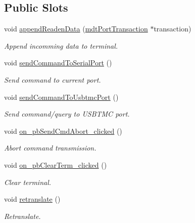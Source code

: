 \subsection*{Public Slots}
\begin{DoxyCompactItemize}
\item 
void \hyperlink{classmdt_port_term_a2c8de2e82437fc94420ccb542cc42bf2}{append\-Readen\-Data} (\hyperlink{classmdt_port_transaction}{mdt\-Port\-Transaction} $\ast$transaction)
\begin{DoxyCompactList}\small\item\em Append incomming data to terminal. \end{DoxyCompactList}\item 
void \hyperlink{classmdt_port_term_ae83cb3183870f167426d1ede3ebca5b9}{send\-Command\-To\-Serial\-Port} ()
\begin{DoxyCompactList}\small\item\em Send command to current port. \end{DoxyCompactList}\item 
void \hyperlink{classmdt_port_term_a52a207c0d9343638828feb4a631eed89}{send\-Command\-To\-Usbtmc\-Port} ()
\begin{DoxyCompactList}\small\item\em Send command/query to U\-S\-B\-T\-M\-C port. \end{DoxyCompactList}\item 
void \hyperlink{classmdt_port_term_a1b232e686b401d7103eb1c682be330a9}{on\-\_\-pb\-Send\-Cmd\-Abort\-\_\-clicked} ()
\begin{DoxyCompactList}\small\item\em Abort command transmission. \end{DoxyCompactList}\item 
void \hyperlink{classmdt_port_term_abb3fc55837782dbea240b069a48b18ce}{on\-\_\-pb\-Clear\-Term\-\_\-clicked} ()
\begin{DoxyCompactList}\small\item\em Clear terminal. \end{DoxyCompactList}\item 
void \hyperlink{classmdt_port_term_a542e20f789bcdc5f2ddf2b6e698ceea2}{retranslate} ()
\begin{DoxyCompactList}\small\item\em Retranslate. \end{DoxyCompactList}\end{DoxyCompactItemize}

